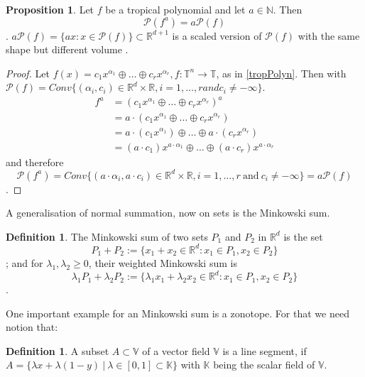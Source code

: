 \documentclass{article}
\theoremstyle{definition}
\newtheorem{definition}[theorem]{Definition}
\newtheorem{proposition}[theorem]{Proposition}
\begin{document}
\begin{proposition}
Let $f$ be a tropical polynomial and let $a \in \mathbb{N}$. Then
$$ \mathcal{P}(f^{a}) = a \mathcal{P}(f) $$.
$a \mathcal{P}(f) = \{ax : x \in \mathcal{P}(f) \} \subset \mathbb{R}^{d + 1}$ is a scaled version of $\mathcal{P}(f)$ with the same shape but different volume \cite[p.~4]{zhang2018tropical}.
\end{proposition}
\begin{proof}
Let $f(x)=c_{1}x^{\alpha_1} \oplus \dots \oplus c_{r}x^{\alpha_r}, f:\mathbb{T}^{n} \to \mathbb{T}$, as in \ref{tropPolyn}. Then with $\mathcal{P}(f) = Conv\{(\alpha_{i}, c_{i}) \in \mathbb{R}^{d} \times \mathbb{R}, i= 1, \dots , r and c_{i} \neq - \infty \}$.
\begin{align*}
f^{a} &= (c_{1}x^{\alpha_{1}} \oplus \dots \oplus c_{r} x^{\alpha_{r}})^{a} \\
&= a \cdot (c_{1}x^{\alpha_{1}} \oplus \dots \oplus c_{r} x^{\alpha_{r}}) \\
&= a \cdot (c_{1}x^{\alpha_{1}}) \oplus \dots \oplus a \cdot (c_{r} x^{\alpha_{r}}) \\
&= (a \cdot c_{1})x^{a \cdot \alpha_{1}} \oplus \dots \oplus (a \cdot c_{r}) x^{a \cdot \alpha_{r}}
\end{align*}
and therefore
$$\mathcal{P}(f^{a}) = Conv\{(a \cdot \alpha_{i}, a \cdot c_{i}) \in \mathbb{R}^{d} \times \mathbb{R}, i = 1, \dots, r \ \text{and} \ c_{i} \neq - \infty \} = a\mathcal{P}(f)$$.
\end{proof}

A generalisation of normal summation, now on sets is the Minkowski sum.

\begin{definition}
The Minkowski sum of two sets $P_1$ and $P_2$ in $\mathbb{R}^{d}$ is the set
$$ P_1 + P_2 := \{x_1 + x_2 \in \mathbb{R}^{d} : x_1 \in P_1 ,x_2 \in P_2 \} $$;
and for $\lambda_1 , \lambda_2 \geq 0$, their weighted Minkowski sum is
$$ \lambda_1 P_1 + \lambda_2 P_2 := \{ \lambda_1 x_1 + \lambda_2 x_2 \in \mathbb{R}^{d} : x_1 \in P_1 , x_2 \in P_2 \} $$ \cite[p.~4]{zhang2018tropical}.
\end{definition}

One important example for an Minkowski sum is a zonotope. For that we need notion that: 
\begin{definition}
A subset $A \subset \mathbb{V}$ of a vector field $\mathbb{V}$ is a line segment, if $A=\{\lambda x + \lambda (1-y) \ | \ \lambda \in [0,1]\subset \mathbb{K}\}$ with $\mathbb{K}$ being the scalar field of $\mathbb{V}$.
\end{definition}
\end{document}
